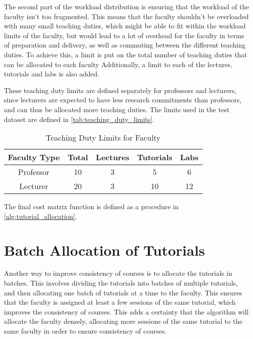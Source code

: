 The second part of the workload distribution is ensuring that the workload of the faculty isn't too fragmented. This means that the faculty shouldn't be overloaded with many small teaching duties, which might be able to fit within the workload limits of the faculty, but would lead to a lot of overhead for the faculty in terms of preparation and delivery, as well as commuting between the different teaching duties. To achieve this, a limit is put on the total number of teaching duties that can be allocated to each faculty Additionally, a limit to each of the lectures, tutorials and labs is also added.

These teaching duty limits are defined separately for professors and lecturers, since lecturers are expected to have less research commitments than professors, and can thus be allocated more teaching duties. The limits used in the test dataset are defined in \autoref{tab:teaching_duty_limits}.

\begin{table}[H]
  \centering
  \begin{tabular}{|c|c|c|c|c|}
    \hline
    Faculty Type & Total & Lectures & Tutorials & Labs \\ \hline
    Professor    & 10    & 3        & 5         & 6    \\ \hline
    Lecturer     & 20    & 3        & 10        & 12   \\ \hline
  \end{tabular}
  \caption{Teaching Duty Limits for Faculty}
  \label{tab:teaching_duty_limits}
\end{table}

The final cost matrix function is defined as a procedure in \autoref{alg:tutorial_allocation}.

\section{Batch Allocation of Tutorials}

Another way to improve consistency of courses is to allocate the tutorials in batches. This involves dividing the tutorials into batches of multiple tutorials, and then allocating one batch of tutorials at a time to the faculty. This ensures that the faculty is assigned at least a few sessions of the same tutorial, which improves the consistency of courses. This adds a certainty that the algorithm will allocate the faculty densely, allocating more sessions of the same tutorial to the same faculty in order to ensure consistency of courses.

